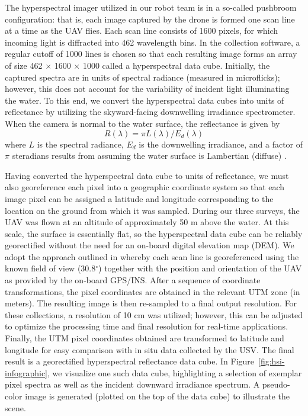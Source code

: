 The hyperspectral imager utilized in our robot team is in a so-called pushbroom configuration: that is, each image captured by the drone is formed one scan line at a time as the UAV flies. Each scan line consists of 1600 pixels, for which incoming light is diffracted into 462 wavelength bins. In the collection software, a regular cutoff of 1000 lines is chosen so that each resulting image forms an array of size 462 $\times$ 1600 $\times$ 1000 called a hyperspectral data cube. Initially, the captured spectra are in units of spectral radiance (measured in microflicks); however, this does not account for the variability of incident light illuminating the water. To this end, we convert the hyperspectral data cubes into units of reflectance by utilizing the skyward-facing downwelling irradiance spectrometer. When the camera is normal to the water surface, the reflectance is given by
\begin{equation}
    R(\lambda) = \pi L(\lambda)/E_d(\lambda)
\end{equation}
where $L$ is the spectral radiance, $E_d$ is the downwelling irradiance, and a factor of $\pi$ steradians results from assuming the water surface is Lambertian (diffuse) \cite{ruddick2019review}. 

Having converted the hyperspectral data cube to units of reflectance, we must also georeference each pixel into a geographic coordinate system so that each image pixel can be assigned a latitude and longitude corresponding to the location on the ground from which it was sampled. During our three surveys, the UAV was flown at an altitude of approximately %
50 m above the water. At this scale, the surface is essentially flat, so the hyperspectral data cube can be reliably georectified without the need for an on-board digital elevation map (DEM). We adopt the approach outlined in \cite{muller2002program, baumker2001new, mostafa2000multi} whereby each scan line is georeferenced using the known field of view (30.8$^\circ$) together with the position and orientation of the UAV as provided by the on-board GPS/INS. After a sequence of coordinate transformations, the pixel coordinates are obtained in the relevant UTM zone (in meters). The resulting image is then re-sampled to a final output resolution. For these collections, a resolution of 10 cm was utilized; however, this can be adjusted to optimize the processing time and final resolution for real-time applications. Finally, the UTM pixel coordinates obtained are transformed to latitude and longitude for easy comparison with in situ data collected by the USV. The final result is a georectified hyperspectral reflectance data cube. In Figure~\ref{fig:hsi-infographic}, we visualize one such data cube, highlighting a selection of exemplar pixel spectra as well as the incident downward irradiance spectrum. A pseudo-color image is generated (plotted on the top of the data cube) to illustrate the scene.

